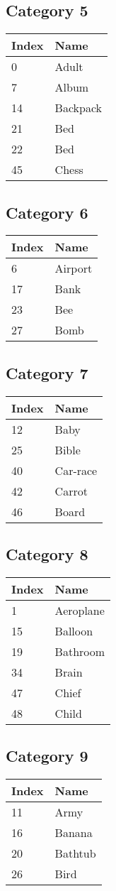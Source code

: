 \documentclass[12pt,a4paper]{article} %
\begin{document}
\subsection{Category 5}
\begin{tabular}[c]{ll}
    Index & Name \\
    \hline
            0& Adult\\
            7& Album\\
            14& Backpack\\
            21& Bed\\
            22& Bed\\
            45& Chess\\
    \end{tabular}
\subsection{Category 6}
\begin{tabular}[c]{ll}
    Index & Name \\
    \hline
            6& Airport\\
            17& Bank\\
            23& Bee\\
            27& Bomb\\
    \end{tabular}
\subsection{Category 7}
\begin{tabular}[c]{ll}
    Index & Name \\
    \hline
            12& Baby\\
            25& Bible\\
            40& Car-race\\
            42& Carrot\\
            46& Board\\
    \end{tabular}
\subsection{Category 8}
\begin{tabular}[c]{ll}
    Index & Name \\
    \hline
            1& Aeroplane\\
            15& Balloon\\
            19& Bathroom\\
            34& Brain\\
            47& Chief\\
            48& Child\\
    \end{tabular}
\subsection{Category 9}
\begin{tabular}[c]{ll}
    Index & Name \\
    \hline
            11& Army\\
            16& Banana\\
            20& Bathtub\\
            26& Bird\\
    \end{tabular}
\end{document}
